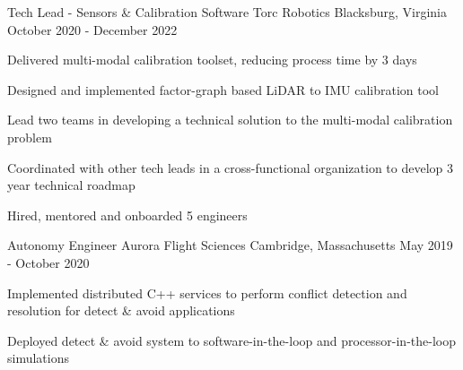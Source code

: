 \begin{cventries}
  \cventry
    {Tech Lead - Sensors \& Calibration Software} %
    {Torc Robotics} %
    {Blacksburg, Virginia} %
    {October 2020 - December 2022} %
    {
      \begin{cvitems}
          \item{Delivered multi-modal calibration toolset, reducing process time by 3 days}
          \item{Designed and implemented factor-graph based LiDAR to IMU calibration tool}
          \item{Lead two teams in developing a technical solution to the multi-modal calibration problem}
          \item{Coordinated with other tech leads in a cross-functional organization to develop 3 year technical roadmap}
          \item{Hired, mentored and onboarded 5 engineers}
      \end{cvitems}
    }

  \cventry
    {Autonomy Engineer} %
    {Aurora Flight Sciences} %
    {Cambridge, Massachusetts} %
    {May 2019 - October 2020} %
    {
      \begin{cvitems}
          \item{Implemented distributed C++ services to perform conflict detection and resolution for detect \& avoid applications}
          \item{Deployed detect \& avoid system to software-in-the-loop and processor-in-the-loop simulations}
      \end{cvitems}
    }



\end{cventries}
